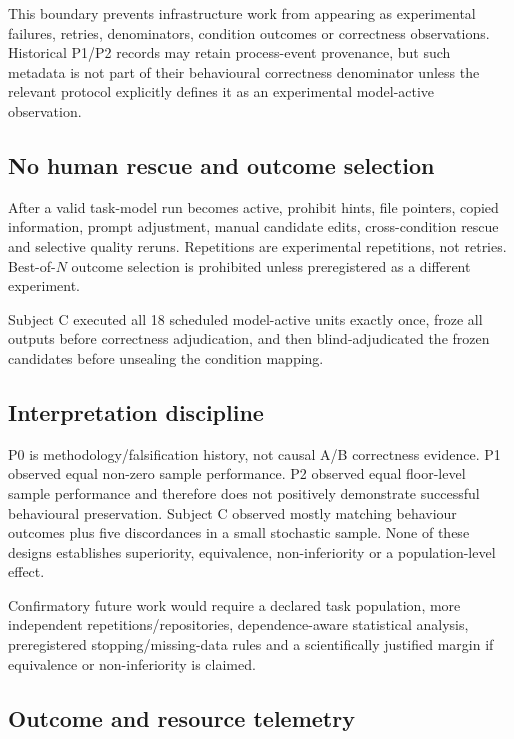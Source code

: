 This boundary prevents infrastructure work from appearing as experimental failures, retries, denominators, condition outcomes or correctness observations. Historical P1/P2 records may retain process-event provenance, but such metadata is not part of their behavioural correctness denominator unless the relevant protocol explicitly defines it as an experimental model-active observation.

\subsection{No human rescue and outcome selection}

After a valid task-model run becomes active, prohibit hints, file pointers, copied information, prompt adjustment, manual candidate edits, cross-condition rescue and selective quality reruns. Repetitions are experimental repetitions, not retries. Best-of-$N$ outcome selection is prohibited unless preregistered as a different experiment.

Subject C executed all 18 scheduled model-active units exactly once, froze all outputs before correctness adjudication, and then blind-adjudicated the frozen candidates before unsealing the condition mapping.

\subsection{Interpretation discipline}

P0 is methodology/falsification history, not causal A/B correctness evidence. P1 observed equal non-zero sample performance. P2 observed equal floor-level sample performance and therefore does not positively demonstrate successful behavioural preservation. Subject C observed mostly matching behaviour outcomes plus five discordances in a small stochastic sample. None of these designs establishes superiority, equivalence, non-inferiority or a population-level effect.

Confirmatory future work would require a declared task population, more independent repetitions/repositories, dependence-aware statistical analysis, preregistered stopping/missing-data rules and a scientifically justified margin if equivalence or non-inferiority is claimed.

\subsection{Outcome and resource telemetry}

